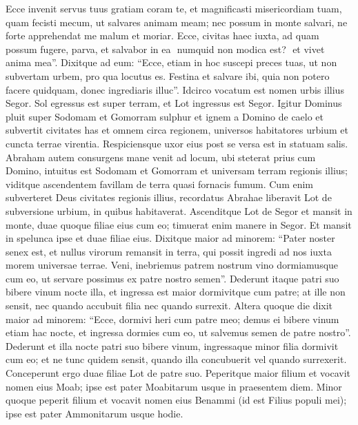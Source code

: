 \begin{biblechapter}
\begin{biblechapter}
\begin{biblechapter}
\begin{biblechapter}
\begin{biblechapter}
\begin{biblechapter}
\begin{biblechapter}
\begin{biblechapter}
\begin{biblechapter}
\begin{biblechapter}
\begin{biblechapter}
\begin{biblechapter}
\begin{biblechapter}
\begin{biblechapter}
\begin{biblechapter}
\begin{biblechapter}
\begin{biblechapter}
\begin{biblechapter}
\begin{biblechapter}
\verse Ecce invenit servus tuus gratiam coram te, et magnificasti misericordiam tuam, quam fecisti mecum, ut salvares animam meam; nec possum in monte salvari, ne forte apprehendat me malum et moriar. 
\verse Ecce, civitas haec iuxta, ad quam possum fugere, parva, et salvabor in ea ­ numquid non modica est? ­ et vivet anima mea”. 
\verse Dixitque ad eum: “Ecce, etiam in hoc suscepi preces tuas, ut non subvertam urbem, pro qua locutus es. 
\verse Festina et salvare ibi, quia non potero facere quidquam, donec ingrediaris illuc”. Idcirco vocatum est nomen urbis illius Segor.
 \verse Sol egressus est super terram, et Lot ingressus est Segor. 
\verse Igitur Dominus pluit super Sodomam et Gomorram sulphur et ignem a Domino de caelo 
 \verse et subvertit civitates has et omnem circa regionem, universos habitatores urbium et cuncta terrae virentia. 
\verse Respiciensque uxor eius post se versa est in statuam salis.
 \verse Abraham autem consurgens mane venit ad locum, ubi steterat prius cum Domino, 
\verse intuitus est Sodomam et Gomorram et universam terram regionis illius; viditque ascendentem favillam de terra quasi fornacis fumum. 
\verse Cum enim subverteret Deus civitates regionis illius, recordatus Abrahae liberavit Lot de subversione urbium, in quibus habitaverat.
 \verse Ascenditque Lot de Segor et mansit in monte, duae quoque filiae eius cum eo; timuerat enim manere in Segor. Et mansit in spelunca ipse et duae filiae eius. 
\verse Dixitque maior ad minorem: “Pater noster senex est, et nullus virorum remansit in terra, qui possit ingredi ad nos iuxta morem universae terrae. 
 \verse Veni, inebriemus patrem nostrum vino dormiamusque cum eo, ut servare possimus ex patre nostro semen”. 
\verse Dederunt itaque patri suo bibere vinum nocte illa, et ingressa est maior dormivitque cum patre; at ille non sensit, nec quando accubuit filia nec quando surrexit. 
\verse Altera quoque die dixit maior ad minorem: “Ecce, dormivi heri cum patre meo; demus ei bibere vinum etiam hac nocte, et ingressa dormies cum eo, ut salvemus semen de patre nostro”. 
\verse Dederunt et illa nocte patri suo bibere vinum, ingressaque minor filia dormivit cum eo; et ne tunc quidem sensit, quando illa concubuerit vel quando surrexerit. 
 \verse Conceperunt ergo duae filiae Lot de patre suo. 
\verse Peperitque maior filium et vocavit nomen eius Moab; ipse est pater Moabitarum usque in praesentem diem. 
 \verse Minor quoque peperit filium et vocavit nomen eius Benammi (id est Filius populi mei); ipse est pater Ammonitarum usque hodie.
 

\end{biblechapter}
\end{biblechapter}
\end{biblechapter}
\end{biblechapter}
\end{biblechapter}
\end{biblechapter}
\end{biblechapter}
\end{biblechapter}
\end{biblechapter}
\end{biblechapter}
\end{biblechapter}
\end{biblechapter}
\end{biblechapter}
\end{biblechapter}
\end{biblechapter}
\end{biblechapter}
\end{biblechapter}
\end{biblechapter}
\end{biblechapter}
